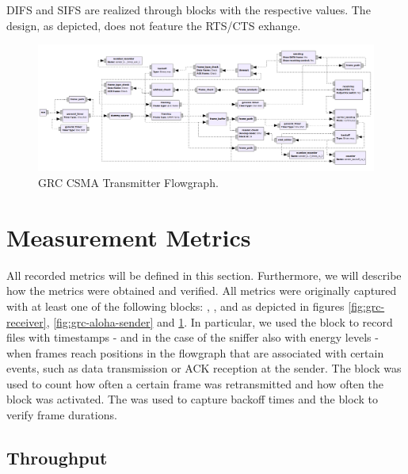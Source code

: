 DIFS and SIFS are realized through  blocks with the respective values. The design, as depicted, does not feature the RTS/CTS exhange.

\begin{figure}
	\label{fig:grc-csma-sender}
	\begin{center}
		\includegraphics[width=\textwidth]{pictures/grc_csma_transmitter_flowgraph}
\end{center}
\caption{GRC CSMA Transmitter Flowgraph.}
\end{figure}

\clearpage

\section{Measurement Metrics}
\label{sec:measurement-metrics}

All recorded metrics will be defined in this section. Furthermore, we will describe how the metrics were obtained and verified. All metrics were originally captured with at least one of the following blocks: , ,  and  as depicted in figures \ref{fig:grc-receiver}, \ref{fig:grc-aloha-sender} and \ref{fig:grc-csma-sender}. In particular, we used the  block to record files with timestamps - and in the case of the sniffer also with energy levels - when frames reach positions in the flowgraph that are associated with certain events, such as data transmission or ACK reception at the sender. The  block was used to count how often a certain frame was retransmitted and how often the  block was activated. The  was used to capture backoff times and the  block to verify frame durations.

\subsection{Throughput}

